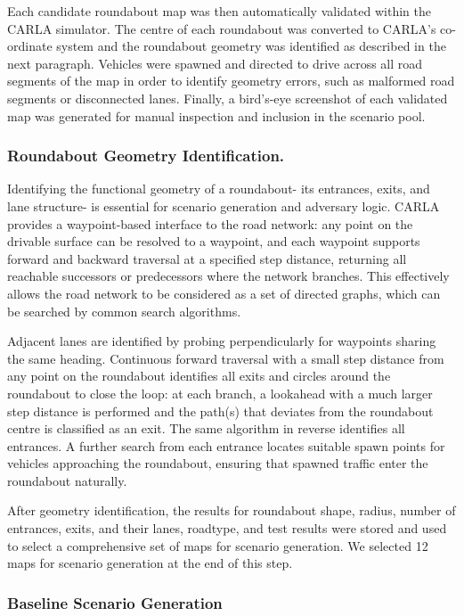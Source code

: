 Each candidate roundabout map was then automatically validated within the CARLA simulator. The centre of each roundabout was converted to CARLA's co-ordinate system and the roundabout geometry was identified as described in the next paragraph. Vehicles were spawned and directed to drive across all road segments of the map in order to identify geometry errors, such as malformed road segments or disconnected lanes. Finally, a bird's-eye screenshot of each validated map was generated for manual inspection and inclusion in the scenario pool.

\subsubsection{Roundabout Geometry Identification.}
Identifying the functional geometry of a roundabout- its entrances, exits, and lane structure- is essential for scenario generation and adversary logic. CARLA provides a waypoint-based interface to the road network: any point on the drivable surface can be resolved to a waypoint, and each waypoint supports forward and backward traversal at a specified step distance, returning all reachable successors or predecessors where the network branches. This effectively allows the road network to be considered as a set of directed graphs, which can be searched by common search algorithms.

Adjacent lanes are identified by probing perpendicularly for waypoints sharing the same heading. Continuous forward traversal with a small step distance from any point on the roundabout identifies all exits and circles around the roundabout to close the loop: at each branch, a lookahead with a much larger step distance is performed and the path(s) that deviates from the roundabout centre is classified as an exit. The same algorithm in reverse identifies all entrances. A further search from each entrance locates suitable spawn points for vehicles approaching the roundabout, ensuring that spawned traffic enter the roundabout naturally.


After geometry identification, the results for roundabout shape, radius, number of entrances, exits, and their lanes, roadtype, and test results were stored and used to select a comprehensive set of maps for scenario generation. We selected 12 maps for scenario generation at the end of this step. 

\subsubsection{Baseline Scenario Generation}

